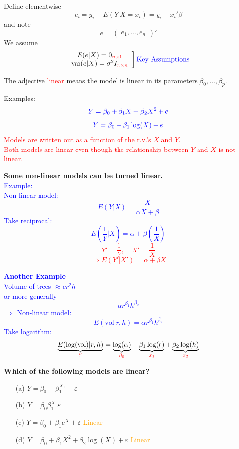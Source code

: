 \documentclass[14pt]{extarticle}
\begin{document}
\noindent
Define elementwise
\[
e_i = y_i - E(Y | X = x_i) = y_i - x_i' \beta
\]
\noindent
and note
\[
e = \begin{pmatrix} e_1, \dots, e_n \end{pmatrix}'
\]
\noindent
We assume
\[
\left.
\begin{array}{c}
E(e | X) = 0_{\textcolor{red}{n \times 1}}\\
\text{var}(e | X) = \sigma^2 I_{\textcolor{red}{n \times n}}    
\end{array}
\right]
\textcolor{blue}{\text{Key Assumptions}}
\]
\textcolor{blue}{\quad \quad \quad \quad {}}

\noindent
The adjective \textcolor{red}{linear} means the model is linear in its parameters $\beta_0, \dots, \beta_p$.

\noindent
Examples:
\[
\textcolor{blue}{Y = \beta_0 + \beta_1 X + \beta_2 X^2 + e}
\]
\[
\textcolor{blue}{Y = \beta_0 + \beta_1 \log(X) + e}
\]
\noindent
\textcolor{red}{Models are written out as a function of the r.v.'s $X$ and $Y$.}\\
\textcolor{red}{Both models are linear even though the relationship between $Y$ and $X$ is not linear.}

\noindent
\textbf{Some non-linear models can be turned linear.}\\
\textcolor{blue}{Example:\\Non-linear model:
\[
E(Y | X) = \frac{X}{\alpha X + \beta}
\]}
\noindent
\textcolor{blue}{Take reciprocal:
\[
E\left(\frac{1}{Y} \Big| X\right) = \alpha + \beta \left(\frac{1}{X}\right)
\]}
\textcolor{red}{
\[
Y' = \frac{1}{Y}, \quad X' = \frac{1}{X}
\]
\[
\Rightarrow E(Y' | X') = \alpha + \beta X
\]}

\noindent
\textcolor{blue}{\textbf{Another Example}\\
Volume of trees $\approx c r^2 h$\\
or more generally
\[
\alpha r^{\beta_1} h^{\beta_2}
\]}
\noindent
\textcolor{blue}{$\Rightarrow$ Non-linear model:
\[
E(\text{vol} | r, h) = \alpha r^{\beta_1} h^{\beta_2}
\]}
\noindent
\textcolor{blue}{Take logarithm:}
\[
\underbrace{E(\log(\text{vol}) | r, h)}_{\textcolor{red}{Y}} = \underbrace{\log(\alpha)}_{\textcolor{red}{\beta_0}} + \underbrace{\beta_1 \log(r)}_{\textcolor{red}{x_1}} + \underbrace{\beta_2 \log(h)}_{\textcolor{red}{x_2}}
\]

\noindent
\textbf{Which of the following models are linear?}

\begin{itemize}
  \item[(a)] $Y = \beta_0 + \beta_1^{X_1} + \varepsilon$
  \item[(b)] $Y = \beta_0 \beta_1^{X_1} \varepsilon$
  \item[(c)] $Y = \beta_0 + \beta_1 e^X + \varepsilon$ \dotfill \textcolor{orange}{Linear}
  \item[(d)] $Y = \beta_0 + \beta_1 X^2 + \beta_2 \log(X) + \varepsilon$ \dotfill \textcolor{orange}{Linear}
\end{itemize}
\end{document}

